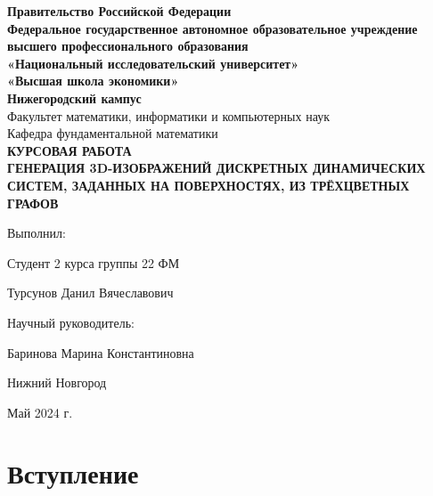 


	\setcounter{page}{1}
	
	\begin{center} 
		\textbf{Правительство Российской Федерации}
		\\ \textbf{Федеральное государственное автономное образовательное учреждение}
		\\ \textbf{высшего профессионального образования}
		\\ \textbf{«Национальный исследовательский университет»}
		\\ \textbf{«Высшая школа экономики»}
		\\ \textbf{Нижегородский кампус}
		\vspace{3cm}
		\\ Факультет математики, информатики и компьютерных наук
		\\ Кафедра фундаментальной математики
		\vspace{3cm}
		\\ \large\textbf{КУРСОВАЯ РАБОТА}
		\vspace{0.3cm}
		\\ \large\textbf{ГЕНЕРАЦИЯ 3D-ИЗОБРАЖЕНИЙ ДИСКРЕТНЫХ ДИНАМИЧЕСКИХ СИСТЕМ, ЗАДАННЫХ НА ПОВЕРХНОСТЯХ, ИЗ ТРЁХЦВЕТНЫХ ГРАФОВ}
	\end{center}
	
	\vspace{3cm}\hspace{8cm} Выполнил: 
	\par \hspace{8cm} Студент 2 курса группы 22 ФМ 
	\par \hspace{8cm} Турсунов Данил Вячеславович
	\par \vspace{0.8cm} \hspace{8cm} Научный руководитель:
	\par \hspace{8cm} Баринова Марина Константиновна
	\begin{center} 
		\vspace{4cm} Нижний Новгород
		\par Май 2024 г.
	\end{center}
	\newpage
	
	\tableofcontents
	\newpage

	\section{Вступление}
